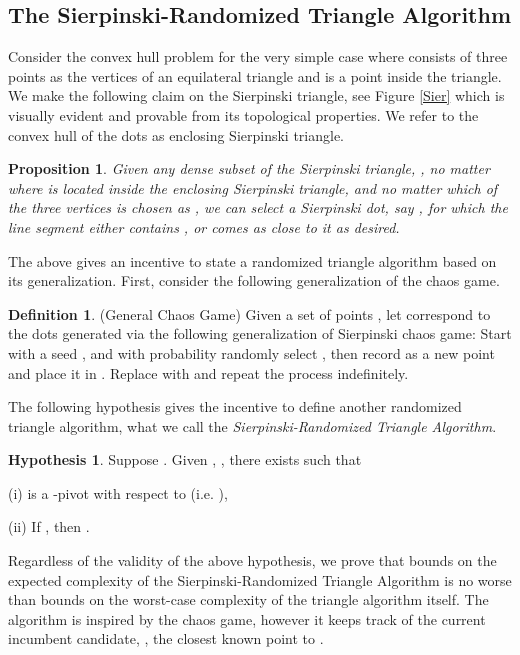 \documentclass{article}
\newtheorem{prop}{Proposition}
\theoremstyle{definition}
\newtheorem{definition}{Definition}
\newtheorem{hypothesis}{Hypothesis}
\begin{document}
\subsection{The Sierpinski-Randomized Triangle Algorithm}

Consider the convex hull problem for the very simple case where  consists of three points as the vertices of an equilateral triangle and  is a point inside the triangle.  We make the following claim on the Sierpinski triangle, see  Figure \ref{Sier} which is visually evident and provable from its topological properties. We  refer to the convex hull of the dots as enclosing Sierpinski triangle.\\

\begin{prop}
Given any dense subset of the Sierpinski triangle, , no matter where  is located inside the enclosing Sierpinski triangle, and no matter which of the three vertices is chosen as , we can select a Sierpinski dot, say , for which the line segment  either contains , or comes as close to it as desired.
\end{prop}

The above gives an incentive to state a randomized triangle algorithm based on its generalization. First, consider the following generalization of the chaos game.

\begin{definition}(General Chaos Game)
Given a set of points  , let  correspond to the dots generated via the following generalization of Sierpinski chaos game: Start with a seed , and with probability  randomly select , then record  as a new point and place it in . Replace  with  and repeat the process indefinitely.
\end{definition}

The following hypothesis gives the incentive to define another randomized triangle algorithm, what we call the {\it Sierpinski-Randomized Triangle Algorithm}.

\begin{hypothesis}
Suppose . Given , ,  there exists  such that

(i)  is a -pivot with respect to  (i.e. ),

(ii)  If , then .
\end{hypothesis}

Regardless of the validity of the above hypothesis, we prove that bounds on the expected complexity of the Sierpinski-Randomized Triangle Algorithm is no worse than bounds on the worst-case complexity of the triangle algorithm itself.  The algorithm is inspired by the chaos game, however it keeps track of the current incumbent candidate, , the closest known point to .
\end{document}
